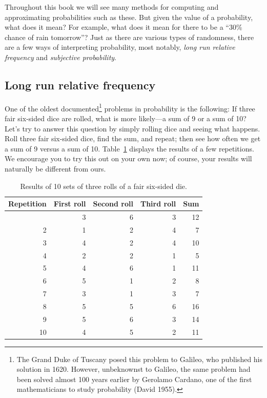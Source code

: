 \documentclass[
  letterpaper,
  DIV=11,
  numbers=noendperiod]{scrreprt}
\theoremstyle{plain}
\theoremstyle{definition}
\theoremstyle{definition}
\theoremstyle{definition}
\theoremstyle{remark}
\begin{document}
Throughout this book we will see many methods for computing and
approximating probabilities such as these. But given the value of a
probability, what does it mean? For example, what does it mean for there
to be a ``30\% chance of rain tomorrow''? Just as there are various
types of randomness, there are a few ways of interpreting probability,
most notably, \emph{long run relative frequency} and \emph{subjective
probability}.

\subsection{Long run relative frequency}\label{sec-rel-freq}

One of the oldest documented\footnote{The Grand Duke of Tuscany posed
  this problem to Galileo, who published his solution in 1620. However,
  unbeknownst to Galileo, the same problem had been solved almost 100
  years earlier by Gerolamo Cardano, one of the first mathematicians to
  study probability (David 1955).} problems in probability is the
following: If three fair six-sided dice are rolled, what is more
likely---a sum of 9 or a sum of 10? Let's try to answer this question by
simply rolling dice and seeing what happens. Roll three fair six-sided
dice, find the sum, and repeat; then see how often we get a sum of 9
versus a sum of 10. Table~\ref{tbl-galileo-dice-table} displays the
results of a few repetitions. We encourage you to try this out on your
own now; of course, your results will naturally be different from ours.

\begin{longtable}[]{@{}rrrrr@{}}

\caption{\label{tbl-galileo-dice-table}Results of 10 sets of three rolls
of a fair six-sided die.}

\tabularnewline

\toprule\noalign{}
Repetition & First roll & Second roll & Third roll & Sum \\
\midrule\noalign{}
\endhead
\bottomrule\noalign{}
\endlastfoot
1 & 3 & 6 & 3 & 12 \\
2 & 1 & 2 & 4 & 7 \\
3 & 4 & 2 & 4 & 10 \\
4 & 2 & 2 & 1 & 5 \\
5 & 4 & 6 & 1 & 11 \\
6 & 5 & 1 & 2 & 8 \\
7 & 3 & 1 & 3 & 7 \\
8 & 5 & 5 & 6 & 16 \\
9 & 5 & 6 & 3 & 14 \\
10 & 4 & 5 & 2 & 11 \\

\end{longtable}
\end{document}
